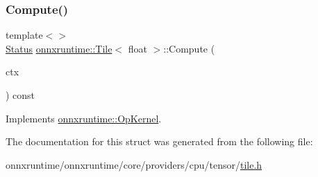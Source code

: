 \subsubsection{\texorpdfstring{Compute()}{Compute()}\hspace{0.1cm}{\footnotesize\ttfamily [2/2]}}
{\footnotesize\ttfamily template$<$$>$ \\
\mbox{\hyperlink{classonnxruntime_1_1common_1_1Status}{Status}} \mbox{\hyperlink{structonnxruntime_1_1Tile}{onnxruntime\+::\+Tile}}$<$ float $>$\+::Compute (\begin{DoxyParamCaption}\item[{\mbox{\hyperlink{classonnxruntime_1_1OpKernelContext}{Op\+Kernel\+Context}} $\ast$}]{ctx }\end{DoxyParamCaption}) const\hspace{0.3cm}{\ttfamily [virtual]}}



Implements \mbox{\hyperlink{classonnxruntime_1_1OpKernel_a9eca8656a78b1b3ab9d3351a12798650}{onnxruntime\+::\+Op\+Kernel}}.



The documentation for this struct was generated from the following file\+:\begin{DoxyCompactItemize}
\item 
onnxruntime/onnxruntime/core/providers/cpu/tensor/\mbox{\hyperlink{cpu_2tensor_2tile_8h}{tile.\+h}}\end{DoxyCompactItemize}
